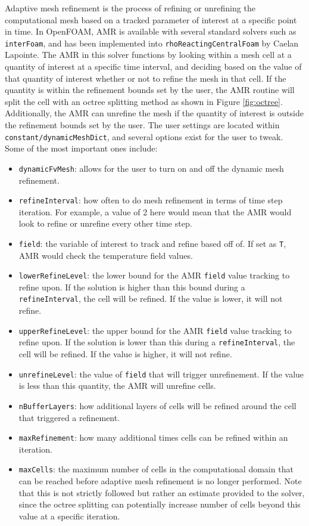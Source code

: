 Adaptive mesh refinement is the process of refining or unrefining the computational mesh based on a tracked parameter of interest at a specific point in time. In OpenFOAM, AMR is available with several standard solvers such as \verb|interFoam|, and has been implemented into \verb|rhoReactingCentralFoam| by Caelan Lapointe. The AMR in this solver functions by looking within a mesh cell at a quantity of interest at a specific time interval, and deciding based on the value of that quantity of interest whether or not to refine the mesh in that cell. If the quantity is within the refinement bounds set by the user, the AMR routine will split the cell with an octree splitting method as shown in Figure \ref{fig:octree}. Additionally, the AMR can unrefine the mesh if the quantity of interest is outside the refinement bounds set by the user. The user settings are located within \verb|constant/dynamicMeshDict|, and several options exist for the user to tweak. Some of the most important ones include:
\begin{itemize}
\item \verb|dynamicFvMesh|: allows for the user to turn on and off the dynamic mesh refinement. 
\item \verb|refineInterval|: how often to do mesh refinement in terms of time step iteration. For example, a value of 2 here would mean that the AMR would look to refine or unrefine every other time step. 
\item \verb|field|: the variable of interest to track and refine based off of. If set as \verb|T|, AMR would check the temperature field values.  
\item \verb|lowerRefineLevel|: the lower bound for the AMR \verb|field| value tracking to refine upon. If the solution is higher than this bound during a \verb|refineInterval|, the cell will be refined. If the value is lower, it will not refine. 
\item \verb|upperRefineLevel|: the upper bound for the AMR \verb|field| value tracking to refine upon. If the solution is lower than this during a \verb|refineInterval|, the cell will be refined. If the value is higher, it will not refine. 
\item \verb|unrefineLevel|: the value of \verb|field| that will trigger unrefinement. If the value is less than this quantity, the AMR will unrefine cells. 
\item \verb|nBufferLayers|: how additional layers of cells will be refined around the cell that triggered a refinement. 
\item \verb|maxRefinement|: how many additional times cells can be refined within an iteration. 
\item \verb|maxCells|: the maximum number of cells in the computational domain that can be reached before adaptive mesh refinement is no longer performed. Note that this is not strictly followed but rather an estimate provided to the solver, since the octree splitting can potentially increase number of cells beyond this value at a specific iteration.
\end{itemize}
